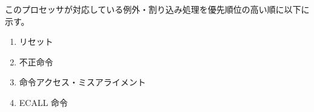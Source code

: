 \documentclass[../specifications.tex]{subfiles}
\begin{document}
  このプロセッサが対応している例外・割り込み処理を優先順位の高い順に以下に示す。
  \begin{enumerate}
    \item リセット
    \item 不正命令
    \item 命令アクセス・ミスアライメント
    \item ECALL 命令
  \end{enumerate}
\end{document}
